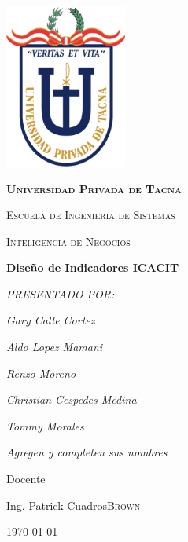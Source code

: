 \documentclass[12pt,a4paper]{report}
\begin{document}
\begin{titlepage}
	\centering
	\includegraphics[width=4cm]{./images/upt}\par\vspace{1cm}
	{\scshape\LARGE\huge\bfseries Universidad Privada de Tacna \par}
	{\scshape\LARGE Escuela de Ingenieria de Sistemas \par}
	\vspace{1cm}
	{\scshape\Large Inteligencia de Negocios\par}
	\vspace{0.5cm}
	{\huge\bfseries Diseño de Indicadores ICACIT\par}
	\vspace{1cm}

	{\Large\itshape PRESENTADO POR:\par}
	{\Large\itshape Gary Calle Cortez\par}
	{\Large\itshape Aldo Lopez Mamani\par}
	{\Large\itshape Renzo Moreno\par}
	{\Large\itshape Christian Cespedes Medina\par}
	{\Large\itshape Tommy Morales\par}
	{\Large\itshape Agregen y completen sus nombres\par}
	\vfill
	Docente\par
	Ing. Patrick Cuadros\textsc{Brown}

	\vfill

	{\large \today\par}

\end{titlepage}

\begin{abstract}
Esta es una plantilla simple para crear un articulo \LaTeX en español, con algunos comandos que se usarán frecuentemente para hacer tareas de la licenciatura en Física.
\end{abstract}
\end{document}
